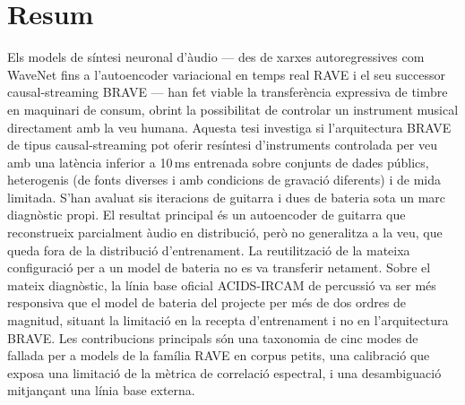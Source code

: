 \documentclass[a4paper,11pt,oneside,openany]{book}
\begin{document}
\chapter*{Resum}
%
Els models de síntesi neuronal d'àudio --- des de xarxes autoregressives com WaveNet fins a l'autoencoder variacional en temps real RAVE i el seu successor causal-streaming BRAVE --- han fet viable la transferència expressiva de timbre en maquinari de consum, obrint la possibilitat de controlar un instrument musical directament amb la veu humana. Aquesta tesi investiga si l'arquitectura BRAVE de tipus causal-streaming pot oferir resíntesi d'instruments controlada per veu amb una latència inferior a 10\,ms entrenada sobre conjunts de dades públics, heterogenis (de fonts diverses i amb condicions de gravació diferents) i de mida limitada. S'han avaluat sis iteracions de guitarra i dues de bateria sota un marc diagnòstic propi. El resultat principal és un autoencoder de guitarra que reconstrueix parcialment àudio en distribució, però no generalitza a la veu, que queda fora de la distribució d'entrenament. La reutilització de la mateixa configuració per a un model de bateria no es va transferir netament. Sobre el mateix diagnòstic, la línia base oficial ACIDS-IRCAM de percussió va ser més responsiva que el model de bateria del projecte per més de dos ordres de magnitud, situant la limitació en la recepta d'entrenament i no en l'arquitectura BRAVE. Les contribucions principals són una taxonomia de cinc modes de fallada per a models de la família RAVE en corpus petits, una calibració que exposa una limitació de la mètrica de correlació espectral, i una desambiguació mitjançant una línia base externa.
%
\end{document}
